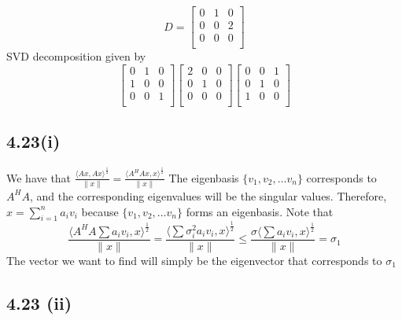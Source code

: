 \documentclass[letterpaper,12pt]{article}
\theoremstyle{definition}
\begin{document}
\[D=
\begin{bmatrix}
   0 &  1 & 0 \\
   0 &  0 & 2\\
   0 & 0 & 0\\
  \end{bmatrix}\]
SVD decomposition given by
\[
\begin{bmatrix}
   0 &  1 & 0 \\
   1 &  0 & 0\\
   0 & 0 & 1\\
  \end{bmatrix}
  \begin{bmatrix}
   2 &  0 & 0 \\
   0 &  1 & 0\\
   0 & 0 & 0\\
  \end{bmatrix}
  \begin{bmatrix}
   0 &  0 & 1 \\
   0 &  1& 0\\
   1 & 0 & 0\\
  \end{bmatrix}\]











\subsection*{4.23(i)}

    We have that $\frac{\langle Ax, Ax \rangle^{\frac{1}{2}}}{\|x\|}= \frac{\langle 
    A^HAx,x\rangle^\frac{1}{2}}{\|x\|} $
    The eigenbasis $\{v_1,v_2,\dots v_n\}$ corresponds to $A^HA$, and the corresponding eigenvalues will be the singular values. Therefore, 
    $x=\sum ^n_{i=1}a_iv_i$ because $\{v_1,v_2,\dots v_n\}$ forms an eigenbasis. Note that\\
    \begin{equation*}
        \frac{\langle A^HA\sum a_iv_i,x\rangle^{\frac{1}{2}}}{\|x\|} =  \frac{\langle 
            \sum \sigma_i^2 a_i v_i,x\rangle^{\frac{1}{2}}}{\|x\|} \leq \frac{\sigma \langle 
                \sum a_i v_i,x\rangle^{\frac{1}{2}}}{\|x\|}=\sigma_1
    \end{equation*}
    The vector we want to find will simply be the eigenvector that corresponds to $\sigma_1$

\subsection*{4.23 (ii)}
\end{document}
